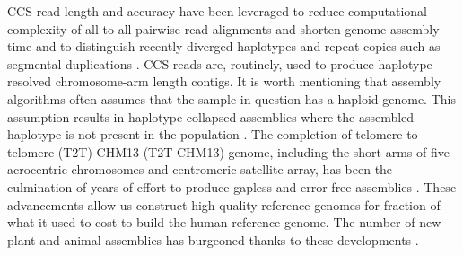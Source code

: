 CCS read length and accuracy have been leveraged to reduce computational complexity of all-to-all pairwise read alignments and shorten genome assembly time \cite{Chin_undated-ye} and to distinguish recently diverged haplotypes and repeat copies such as segmental duplications \cite{Nurk2020-gu, Cheng2021-ij}. CCS reads are, routinely, used to produce haplotype-resolved chromosome-arm length contigs. It is worth mentioning that assembly algorithms often assumes that the sample in question has a haploid genome. This assumption results in haplotype collapsed assemblies where the assembled haplotype is not present in the population \cite{Schneider2017-yo}. The completion of telomere-to-telomere (T2T) CHM13 (T2T-CHM13) genome, including the short arms of five acrocentric chromosomes and centromeric satellite array, has been the culmination of years of effort to produce gapless and error-free assemblies \cite{Nurk2022-dv}. These advancements allow us construct high-quality reference genomes for fraction of what it used to cost to build the human reference genome. The number of new plant and animal assemblies has burgeoned thanks to these developments \cite{}. 


